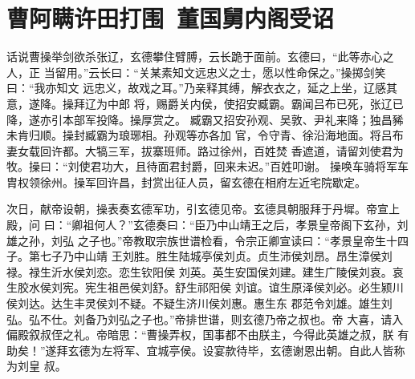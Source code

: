 \chapter{曹阿瞒许田打围~董国舅内阁受诏}

话说曹操举剑欲杀张辽，玄德攀住臂膊，云长跪于面前。玄德曰，“此等赤心之人，正
当留用。”云长曰：“关某素知文远忠义之士，愿以性命保之。”操掷剑笑曰：“我亦知文
远忠义，故戏之耳。”乃亲释其缚，解衣衣之，延之上坐，辽感其意，遂降。操拜辽为中郎
将，赐爵关内侯，使招安臧霸。霸闻吕布已死，张辽已降，遂亦引本部军投降。操厚赏之。
臧霸又招安孙观、吴敦、尹礼来降；独昌豨未肯归顺。操封臧霸为琅琊相。孙观等亦各加
官，令守青、徐沿海地面。将吕布妻女载回许都。大犒三军，拔寨班师。路过徐州，百姓焚
香遮道，请留刘使君为牧。操曰：“刘使君功大，且待面君封爵，回来未迟。”百姓叩谢。
操唤车骑将军车胄权领徐州。操军回许昌，封赏出征人员，留玄德在相府左近宅院歇定。

次日，献帝设朝，操表奏玄德军功，引玄德见帝。玄德具朝服拜于丹墀。帝宣上殿，问
曰：“卿祖何人？”玄德奏曰：“臣乃中山靖王之后，孝景皇帝阁下玄孙，刘雄之孙，刘弘
之子也。”帝教取宗族世谱检看，令宗正卿宣读曰：“孝景皇帝生十四子。第七子乃中山靖
王刘胜。胜生陆城亭侯刘贞。贞生沛侯刘昂。昂生漳侯刘禄。禄生沂水侯刘恋。恋生钦阳侯
刘英。英生安国侯刘建。建生广陵侯刘哀。哀生胶水侯刘宪。宪生祖邑侯刘舒。舒生祁阳侯
刘谊。谊生原泽侯刘必。必生颍川侯刘达。达生丰灵侯刘不疑。不疑生济川侯刘惠。惠生东
郡范令刘雄。雄生刘弘。弘不仕。刘备乃刘弘之子也。”帝排世谱，则玄德乃帝之叔也。帝
大喜，请入偏殿叙叔侄之礼。帝暗思：“曹操弄权，国事都不由朕主，今得此英雄之叔，朕
有助矣！”遂拜玄德为左将军、宜城亭侯。设宴款待毕，玄德谢恩出朝。自此人皆称为刘皇
叔。

